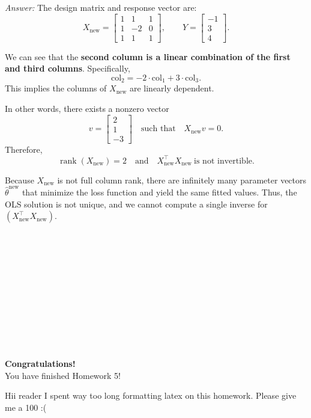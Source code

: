 \documentclass[11pt]{article}
\begin{document}
\medskip
\noindent\textit{Answer:} The design matrix and response vector are:
\[
X_{\text{new}} =
\begin{bmatrix}
1 & 1 & 1\\
1 & -2 & 0\\
1 & 1 & 1
\end{bmatrix},
\qquad
Y =
\begin{bmatrix}
-1\\
3\\
4
\end{bmatrix}.
\]

\noindent
We can see that the \textbf{second column is a linear combination of the first and third columns}. Specifically,
\[
\text{col}_2 = -2 \cdot \text{col}_1 + 3 \cdot \text{col}_3.
\]
This implies the columns of $X_{\text{new}}$ are linearly dependent.

\medskip
\noindent In other words, there exists a nonzero vector
\[
v =
\begin{bmatrix}
2\\[2pt]
1\\[2pt]
-3
\end{bmatrix}
\quad \text{such that} \quad
X_{\text{new}} v = 0.
\]
Therefore,
\[
\operatorname{rank}(X_{\text{new}}) = 2
\quad\text{and}\quad
X_{\text{new}}^{\top} X_{\text{new}}\ \text{is not invertible.}
\]

\medskip
\noindent Because $X_{\text{new}}$ is not full column rank, there are infinitely many parameter vectors $\hat{\theta}^{\text{new}}$ that minimize the loss function and yield the same fitted values. Thus, the OLS solution is not unique, and we cannot compute a single inverse for $(X_{\text{new}}^{\top} X_{\text{new}})$.

\textbf{\\
\\
\\
\\
\\
\\
\\
\\
\\
\\
}


\begin{center}
    \textbf{\Large Congratulations!}\\[6pt]
    You have finished Homework 5!
\end{center}

Hii reader I spent way too long formatting latex on this homework. Please give me a 100 :(
\end{document}
